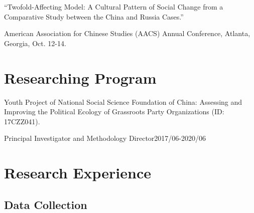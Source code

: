 \documentclass[10.5pt,]{article}
\providecommand{\tightlist}{%
	\setlength{\itemsep}{0pt}\setlength{\parskip}{0pt}}
\renewenvironment{itemize}{
	\begin{list}{}{
			\setlength{\leftmargin}{1.5em}
		}
	}{
	\end{list}
}
\begin{document}
\begin{itemize}
  \begin{itemize}
  \tightlist
  \item
    ``Twofold-Affecting Model: A Cultural Pattern of Social Change from
    a Comparative Study between the China and Russia Cases.''

    \begin{itemize}
    \tightlist
    \item
      \footnotesize American Association for Chinese Studies (AACS)
      Annual Conference, Atlanta, Georgia, Oct. 12-14.
    \end{itemize}
  \end{itemize}
\end{itemize}

\section{Researching Program}\label{researching-program}

\begin{itemize}
\tightlist
\item
  Youth Project of National Social Science Foundation of China:
  Assessing and Improving the Political Ecology of Grassroots Party
  Organizations (ID: 17CZZ041).

  \begin{itemize}
  \tightlist
  \item
    Principal Investigator and Methodology
    Director\hfill 2017/06-2020/06
  \end{itemize}
\end{itemize}

\section{Research Experience}\label{research-experience}

\subsection{Data Collection}\label{data-collection}
\end{document}
